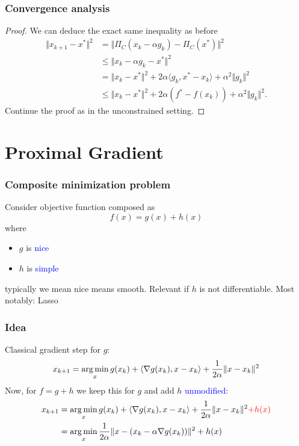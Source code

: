 \documentclass{beamer}
\begin{document}
\begin{frame}
  \frametitle{Convergence analysis}
  \begin{proof}
    We can deduce the exact same inequality as before
    \begin{equation}
      \begin{aligned}
        \Vert x_{k+1} - x^* \Vert^2 &= \Vert \Pi_C(x_k - \alpha g_k) - \Pi_C(x^*) \Vert^2 \\
        &\le \Vert x_k - \alpha g_k - x^* \Vert^2 \\
        &= \Vert x_k-x^* \Vert^2 + 2 \alpha \langle g_k, x^*-x_k \rangle + \alpha^2 \Vert g_k \Vert^2\\
        &\le \Vert x_k-x^* \Vert^2 + 2 \alpha (f^* - f(x_k))+ \alpha^2 \Vert g_k \Vert^2.
      \end{aligned}
    \end{equation}
    Continue the proof as in the unconstrained setting.
  \end{proof}
\end{frame}


\section{Proximal Gradient}%
\label{sec:}


\begin{frame}
  \frametitle{Composite minimization problem}

  Consider objective function composed as
  \begin{equation}
    f(x) = g(x) + h(x)
  \end{equation}
  where
  \begin{itemize}
    \item $g$ is \textcolor{blue}{nice}
    \item $h$ is \textcolor{blue}{simple}
  \end{itemize}
  typically we mean nice means smooth. Relevant if $h$ is not differentiable.
  Most notably: Lasso

\end{frame}


\begin{frame}
  \frametitle{Idea}
  Classical gradient step for $g$:
  \begin{equation}
    x_{k+1} = \operatorname*{arg\,min}_{x} g(x_k) + \langle \nabla g(x_k), x-x_k \rangle + \frac{1}{2 \alpha} \Vert x-x_k \Vert^2
  \end{equation}
  Now, for $f= g+h$ we keep this for $g$ and add $h$ \textcolor{blue}{unmodified}:
  \begin{align}
    x_{k+1} &= \operatorname*{arg\,min}_{x} g(x_k) + \langle \nabla g(x_k), x-x_k \rangle + \frac{1}{2 \alpha} \Vert x-x_k \Vert^2 \textcolor{red}{+ h(x)} \\
    &= \operatorname*{arg\,min}_x \frac{1}{2 \alpha} \Vert x - (x_k - \alpha \nabla g(x_k)) \Vert^2 + h(x)
  \end{align}
\end{frame}
\end{document}
